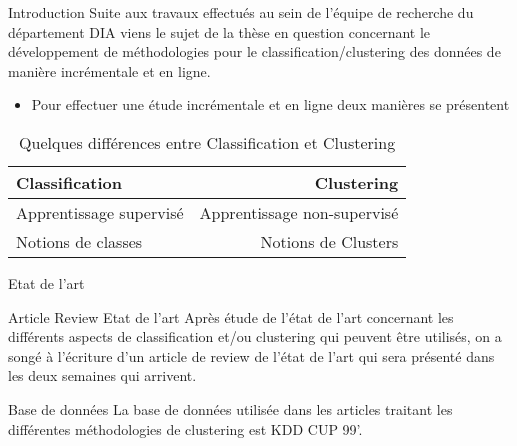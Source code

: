 \documentclass{beamer}
\begin{document}
\begin{frame}{Introduction}
	Suite aux travaux effectués au sein de l'équipe de recherche du département DIA viens le sujet de la thèse en question concernant le développement de méthodologies pour le classification/clustering des données de manière incrémentale et en ligne.

\begin{itemize}
	\item Pour effectuer une étude incrémentale et en ligne deux manières se présentent
\end{itemize}

\begin{table}
\centering
\begin{tabular}{l|r}
Classification & Clustering \\\hline
Apprentissage supervisé & Apprentissage non-supervisé \\
Notions de classes & Notions de Clusters
\end{tabular}
\caption{\label{tab:widgets}Quelques différences entre Classification et Clustering}
\end{table}


\end{frame}

\begin{frame}{Etat de l'art}


\begin{block}{Article Review Etat de l'art}
Après étude de l'état de l'art concernant les différents aspects de classification et/ou clustering qui peuvent être utilisés, on a songé à l'écriture d'un article de review de l'état de l'art qui sera présenté dans les deux semaines qui arrivent.
\end{block}
	
	\begin{block}{Base de données}
			La base de données utilisée dans les articles traitant les différentes méthodologies de clustering est KDD CUP 99'.
	\end{block}


\end{frame}
\end{document}
